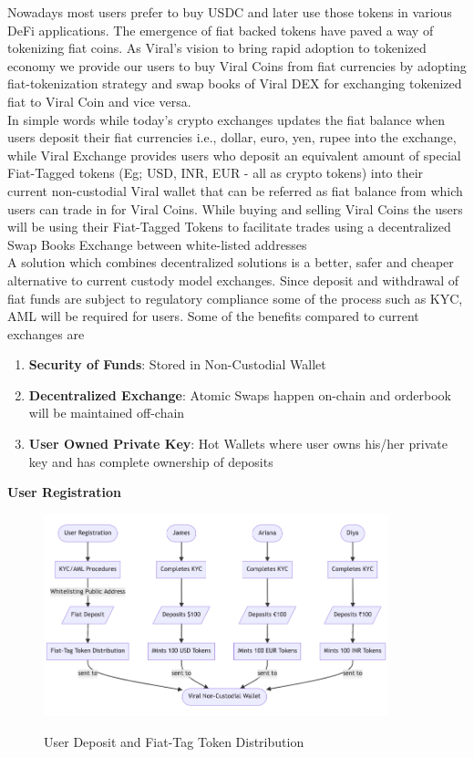 \documentclass[10pt]{article}
\begin{document}
Nowadays most users prefer to buy USDC and later use those tokens in various DeFi applications. The emergence of fiat backed tokens have paved a way of tokenizing fiat coins. As Viral's vision to bring rapid adoption to tokenized economy we provide our users to buy Viral Coins from fiat currencies by adopting fiat-tokenization strategy and swap books of Viral DEX for exchanging tokenized fiat to Viral Coin and vice versa.\\

In simple words while today's crypto exchanges updates the fiat balance when users deposit their fiat currencies i.e., dollar, euro, yen, rupee into the exchange, while Viral Exchange provides users who deposit an equivalent amount of special Fiat-Tagged tokens (Eg; USD, INR, EUR - all as crypto tokens) into their current non-custodial Viral wallet that can be referred as fiat balance from which users can trade in for Viral Coins. While buying and selling Viral Coins the users will be using their Fiat-Tagged Tokens to facilitate trades using a decentralized Swap Books Exchange between white-listed addresses\\

A solution which combines decentralized solutions is a better, safer and cheaper alternative to current custody model exchanges. Since deposit and withdrawal of fiat funds are subject to regulatory compliance some of the process such as KYC, AML will be required for users. Some of the benefits compared to current exchanges are
\begin{enumerate}[leftmargin=+0.2in]
\item \textbf{Security of Funds}: Stored in Non-Custodial Wallet
\item \textbf{Decentralized Exchange}: Atomic Swaps happen on-chain and orderbook will be maintained off-chain
\item \textbf{User Owned Private Key}: Hot Wallets where user owns his/her private key and has complete ownership of deposits
\end{enumerate}

\textbf{User Registration}\\

\begin{figure}[H]
\begin{center}
\includegraphics[width=10cm]{user-deposit}\\
\caption{User Deposit and Fiat-Tag Token Distribution}
\end{center}
\end{figure}
\end{document}
